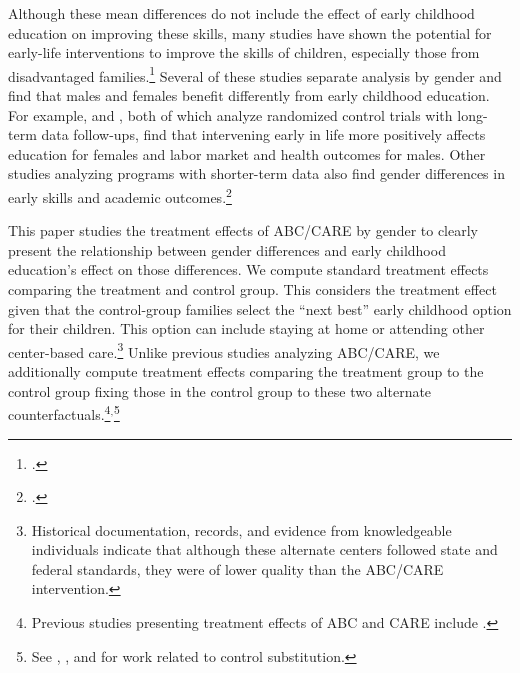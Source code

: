 Although these mean differences do not include the effect of early childhood education on improving these skills, many studies have shown the potential for early-life interventions to improve the skills of children, especially those from disadvantaged families.\footnote{\citet{Currie_2011_AER,Elango_Hojman_etal_2016_Early-Edu}.} Several of these studies separate analysis by gender and find that males and females benefit differently from early childhood education. For example, \citet{Heckman_Moon_etal_2010_QE} and \citet{Garcia_Heckman_Leaf_etal_2017_Comp_CBA_Unpublished}, both of which analyze randomized control trials with long-term data follow-ups, find that intervening early in life more positively affects education for females and labor market and health outcomes for males. Other studies analyzing programs with shorter-term data also find gender differences in early skills and academic outcomes.\footnote{\citet{Deming_2009_AEJAE,Ou_Reynolds_2010_Mechanisms_CYSR,Magnuson_Kelchen_Duncan_etal_2016_ECRQ}.} 

This paper studies the treatment effects of ABC/CARE by gender to clearly present the relationship between gender differences and early childhood education's effect on those differences. We compute standard treatment effects comparing the treatment and control group. This considers the treatment effect given that the control-group families select the ``next best'' early childhood option for their children. This option can include staying at home or attending other center-based care.\footnote{Historical documentation, records, and evidence from knowledgeable individuals indicate that although these alternate centers followed state and federal standards, they were of lower quality than the ABC/CARE intervention.} Unlike previous studies analyzing ABC/CARE, we additionally compute treatment effects comparing the treatment group to the control group fixing those in the control group to these two alternate counterfactuals.\footnote{Previous studies presenting treatment effects of ABC and CARE include \citet{Ramey_etal_1985_Project-CARE_TiECSE, Clarke_Campbell_1998_ABC_Comparison_ECRQ,Campbell_Pungello_etal_2001_DP,Campbell_Ramey_etal_2002_ADS,Campbell_Wasik_etal_2008_ECRQ,Campbell_Conti_etal_2014_EarlyChildhoodInvestments}.}$^,$\footnote{See \cite{Heckman_1992_randomization}, \cite{Heckman_Hohmann_etal_2000_QJE}, and \cite{Kline_Walters_2016_QJE} for work related to control substitution.} 

